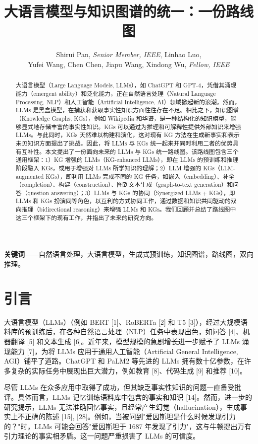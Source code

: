 \documentclass[11pt,UTF8,fontset=fandol]{ctexart}
\title{\textbf{大语言模型与知识图谱的统一：一份路线图}}
\author{Shirui Pan, \textit{Senior Member, IEEE}, Linhao Luo, \\ Yufei Wang, Chen Chen, Jiapu Wang, Xindong Wu, \textit{Fellow, IEEE}}
\date{}
\begin{document}
\maketitle

\begin{abstract}
大语言模型（Large Language Models, LLMs），如 ChatGPT 和 GPT-4，凭借其涌现能力（emergent ability）和泛化能力，正在自然语言处理（Natural Language Processing, NLP）和人工智能（Artificial Intelligence, AI）领域掀起新的浪潮。然而，LLMs 是黑盒模型，在捕获和获取事实性知识方面往往存在不足。相比之下，知识图谱（Knowledge Graphs, KGs），例如 Wikipedia 和华谱，是一种结构化的知识模型，能够显式地存储丰富的事实性知识。KGs 可以通过为推理和可解释性提供外部知识来增强 LLMs。与此同时，KGs 天然难以构建和演化，这对现有 KG 方法在生成新事实和表示未见知识方面提出了挑战。因此，将 LLMs 与 KGs 统一起来并同时利用二者的优势具有互补性。本文提出了一份面向未来的 LLMs 与 KGs 统一路线图。该路线图包含三个通用框架：1）KG 增强的 LLMs（KG-enhanced LLMs），即在 LLMs 的预训练和推理阶段融入 KGs，或用于增强对 LLMs 所学知识的理解；2）LLM 增强的 KGs（LLM-augmented KGs），即利用 LLMs 完成不同的 KG 任务，如嵌入（embedding）、补全（completion）、构建（construction）、图到文本生成（graph-to-text generation）和问答（question answering）；3）LLMs 与 KGs 的协同（Synergized LLMs + KGs），即 LLMs 和 KGs 扮演同等角色，以互利的方式协同工作，通过数据和知识共同驱动的双向推理（bidirectional reasoning）来增强 LLMs 和 KGs。我们回顾并总结了路线图中这三个框架下的现有工作，并指出了未来的研究方向。
\end{abstract}

\noindent\textbf{关键词}——自然语言处理，大语言模型，生成式预训练，知识图谱，路线图，双向推理。

\section{引言}

大语言模型（LLMs）（例如 BERT [1]、RoBERTa [2] 和 T5 [3]），经过大规模语料库的预训练后，在各种自然语言处理（NLP）任务中表现出色，如问答 [4]、机器翻译 [5] 和文本生成 [6]。近年来，模型规模的急剧增长进一步赋予了 LLMs 涌现能力 [7]，为将 LLMs 应用于通用人工智能（Artificial General Intelligence, AGI）铺平了道路。ChatGPT 和 PaLM2 等先进的 LLMs 拥有数十亿参数，在许多复杂的实际任务中展现出巨大潜力，例如教育 [8]、代码生成 [9] 和推荐 [10]。

尽管 LLMs 在众多应用中取得了成功，但其缺乏事实性知识的问题一直备受批评。具体而言，LLMs 记忆训练语料库中包含的事实和知识 [14]。然而，进一步的研究揭示，LLMs 无法准确回忆事实，且经常产生幻觉（hallucination），生成事实上不正确的陈述 [15], [28]。例如，当被问到"爱因斯坦是什么时候发现引力的？"时，LLMs 可能会回答"爱因斯坦于 1687 年发现了引力"，这与牛顿提出万有引力理论的事实相矛盾。这一问题严重损害了 LLMs 的可信度。
\end{document}
